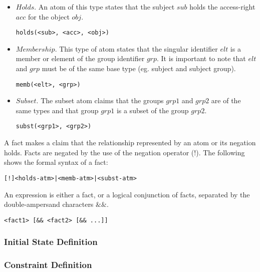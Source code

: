 \documentclass[10pt, twocolumn]{article}
\begin{document}
        \begin{itemize}
          \item
            $Holds$. An atom of this type states that the subject $sub$ holds
            the access-right $acc$ for the object $obj$.

            \begin{verbatim}holds(<sub>, <acc>, <obj>)\end{verbatim}
          \item
            $Membership$. This type of atom states that the singular identifier
            $elt$ is a member or element of the group identifier $grp$. It is
            important to note that $elt$ and $grp$ must be of the same base
            type (eg. subject and subject group).

            \begin{verbatim}memb(<elt>, <grp>)\end{verbatim}
          \item
            $Subset$. The subset atom claims that the groups $grp1$ and $grp2$
            are of the same types and that group $grp1$ is a subset of the
            group $grp2$.
            \begin{verbatim}subst(<grp1>, <grp2>)\end{verbatim}
        \end{itemize}

         A fact makes a claim that the relationship
        represented by an atom or its negation holds. Facts are negated by the
        use of the negation operator ($!$). The following shows the formal
        syntax of a fact:

        \begin{verbatim}[!]<holds-atm>|<memb-atm>|<subst-atm>\end{verbatim}

         An expression is either a fact, or a
        logical conjunction of facts, separated by the double-ampersand
        characters $\&\&$.

        \begin{verbatim}<fact1> [&& <fact2> [&& ...]]\end{verbatim}

      \subsubsection{Initial State Definition}

      \subsubsection{Constraint Definition}
\end{document}
